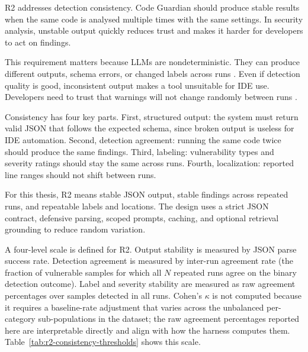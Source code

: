 \label{sec:r2-consistency}

R2 addresses detection consistency. Code Guardian should produce stable results when the same code is analysed multiple times with the same settings. In security analysis, unstable output quickly reduces trust and makes it harder for developers to act on findings.

This requirement matters because LLMs are nondeterministic. They can produce different outputs, schema errors, or changed labels across runs \cite{ji2023hallucination,openai2023gpt4}. Even if detection quality is good, inconsistent output makes a tool unsuitable for IDE use. Developers need to trust that warnings will not change randomly between runs \cite{johnson2013don}.

Consistency has four key parts. First, structured output: the system must return valid JSON that follows the expected schema, since broken output is useless for IDE automation. Second, detection agreement: running the same code twice should produce the same findings. Third, labeling: vulnerability types and severity ratings should stay the same across runs. Fourth, localization: reported line ranges should not shift between runs.

For this thesis, R2 means stable JSON output, stable findings across repeated runs, and repeatable labels and locations. The design uses a strict JSON contract, defensive parsing, scoped prompts, caching, and optional retrieval grounding to reduce random variation.

A four-level scale is defined for R2. Output stability is measured by JSON parse success rate. Detection agreement is measured by inter-run agreement rate (the fraction of vulnerable samples for which all $N$ repeated runs agree on the binary detection outcome). Label and severity stability are measured as raw agreement percentages over samples detected in all runs. Cohen's $\kappa$ is not computed because it requires a baseline-rate adjustment that varies across the unbalanced per-category sub-populations in the dataset; the raw agreement percentages reported here are interpretable directly and align with how the harness computes them. Table~\ref{tab:r2-consistency-thresholds} shows this scale.


